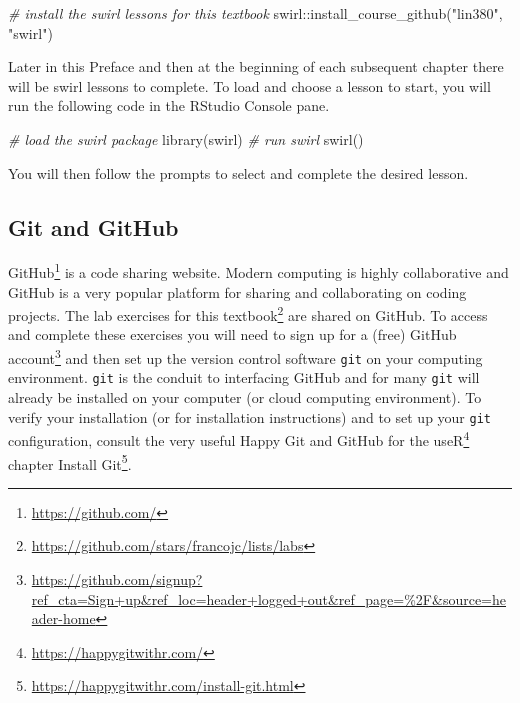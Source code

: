 \documentclass[
  letterpaper,
]{scrbook}
\newenvironment{Shaded}{\begin{snugshade}}{\end{snugshade}}
\newcommand{\CommentTok}[1]{\textcolor[rgb]{0.00,0.00,0.00}{\textit{#1}}}
\newcommand{\FunctionTok}[1]{\textcolor[rgb]{0.00,0.00,0.00}{#1}}
\newcommand{\NormalTok}[1]{\textcolor[rgb]{0.00,0.00,0.00}{#1}}
\newcommand{\SpecialCharTok}[1]{\textcolor[rgb]{0.00,0.00,0.00}{#1}}
\newcommand{\StringTok}[1]{\textcolor[rgb]{0.00,0.00,0.00}{#1}}
\DeclareRobustCommand{\href}[2]{#2\footnote{\url{#1}}}
\begin{document}
\begin{Shaded}
\begin{Highlighting}[]
\CommentTok{\# install the swirl lessons for this textbook}
\NormalTok{swirl}\SpecialCharTok{::}\FunctionTok{install\_course\_github}\NormalTok{(}\StringTok{"lin380"}\NormalTok{, }\StringTok{"swirl"}\NormalTok{)}
\end{Highlighting}
\end{Shaded}

Later in this Preface and then at the beginning of each subsequent
chapter there will be swirl lessons to complete. To load and choose a
lesson to start, you will run the following code in the RStudio Console
pane.

\begin{Shaded}
\begin{Highlighting}[]
\CommentTok{\# load the swirl package}
\FunctionTok{library}\NormalTok{(swirl) }
\CommentTok{\# run swirl}
\FunctionTok{swirl}\NormalTok{()}
\end{Highlighting}
\end{Shaded}

You will then follow the prompts to select and complete the desired
lesson.

\hypertarget{git-and-github}{%
\subsection*{Git and GitHub}\label{git-and-github}}

\href{https://github.com/}{GitHub} is a code sharing website. Modern
computing is highly collaborative and GitHub is a very popular platform
for sharing and collaborating on coding projects. The
\href{https://github.com/stars/francojc/lists/labs}{lab exercises for
this textbook} are shared on GitHub. To access and complete these
exercises you will need to
\href{https://github.com/signup?ref_cta=Sign+up\&ref_loc=header+logged+out\&ref_page=\%2F\&source=header-home}{sign
up for a (free) GitHub account} and then set up the version control
software \texttt{git} on your computing environment. \texttt{git} is the
conduit to interfacing GitHub and for many \texttt{git} will already be
installed on your computer (or cloud computing environment). To verify
your installation (or for installation instructions) and to set up your
\texttt{git} configuration, consult the very useful
\href{https://happygitwithr.com/}{Happy Git and GitHub for the useR}
chapter \href{https://happygitwithr.com/install-git.html}{Install Git}.
\end{document}

